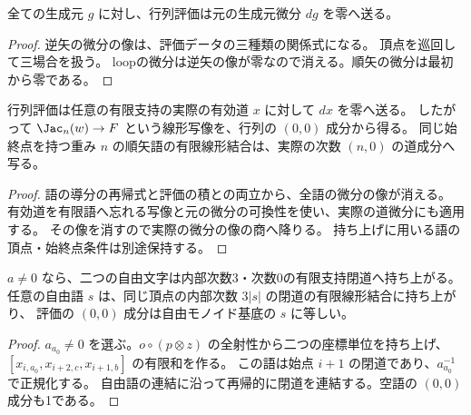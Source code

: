 \begin{lemma}[全生成元の微分の消滅]\label{lem:matrix-relations}
\leanok
{}
全ての生成元 $g$ に対し、行列評価は元の生成元微分 $dg$ を零へ送る。
\end{lemma}
\begin{proof}\leanok
逆矢の微分の像は、評価データの三種類の関係式になる。
頂点を巡回して三場合を扱う。
loopの微分は逆矢の像が零なので消える。順矢の微分は最初から零である。
\end{proof}

\begin{lemma}[実際の道とJacobi商への接続]\label{lem:jacobi-evaluation}
\leanok
{}
行列評価は任意の有限支持の実際の有効道 $x$ に対して $dx$ を零へ送る。
したがって $\Jac_n(w)\to F$ という線形写像を、行列の $(0,0)$ 成分から得る。
同じ始終点を持つ重み $n$ の順矢語の有限線形結合は、実際の次数 $(n,0)$ の道成分へ写る。
\end{lemma}
\begin{proof}\leanok
語の導分の再帰式と評価の積との両立から、全語の微分の像が消える。
有効道を有限語へ忘れる写像と元の微分の可換性を使い、実際の道微分にも適用する。
その像を消すので実際の微分の像の商へ降りる。
持ち上げに用いる語の頂点・始終点条件は別途保持する。
\end{proof}

\begin{lemma}[二つの自由文字の閉道持ち上げ]\label{lem:loop-lifts}
\leanok
{}
$a\ne0$ なら、二つの自由文字は内部次数3・次数0の有限支持閉道へ持ち上がる。
任意の自由語 $s$ は、同じ頂点の内部次数 $3|s|$ の閉道の有限線形結合に持ち上がり、
評価の $(0,0)$ 成分は自由モノイド基底の $s$ に等しい。
\end{lemma}
\begin{proof}\leanok
$a_{a_0}\ne0$ を選ぶ。$o\circ(p\otimes z)$ の全射性から二つの座標単位を持ち上げ、
$[x_{i,a_0},x_{i+2,c},x_{i+1,b}]$ の有限和を作る。
この語は始点 $i+1$ の閉道であり、$a_{a_0}^{-1}$ で正規化する。
自由語の連結に沿って再帰的に閉道を連結する。空語の $(0,0)$ 成分も1である。
\end{proof}

